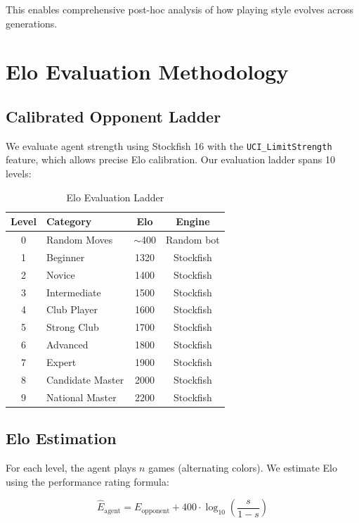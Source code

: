 \documentclass[11pt, twocolumn]{article}
\begin{document}
This enables comprehensive post-hoc analysis of how playing style evolves across generations.

\section{Elo Evaluation Methodology}
\label{sec:elo}

\subsection{Calibrated Opponent Ladder}
We evaluate agent strength using Stockfish 16 \citep{stockfish2023} with the \texttt{UCI\_LimitStrength} feature, which allows precise Elo calibration. Our evaluation ladder spans 10 levels:

\begin{table}[H]
\centering
\caption{Elo Evaluation Ladder}
\label{tab:elo_ladder}
\small
\begin{tabular}{@{}clcc@{}}
\toprule
\textbf{Level} & \textbf{Category} & \textbf{Elo} & \textbf{Engine} \\
\midrule
0 & Random Moves     & $\sim$400  & Random bot \\
1 & Beginner         & 1320 & Stockfish \\
2 & Novice           & 1400 & Stockfish \\
3 & Intermediate     & 1500 & Stockfish \\
4 & Club Player      & 1600 & Stockfish \\
5 & Strong Club      & 1700 & Stockfish \\
6 & Advanced         & 1800 & Stockfish \\
7 & Expert           & 1900 & Stockfish \\
8 & Candidate Master & 2000 & Stockfish \\
9 & National Master  & 2200 & Stockfish \\
\bottomrule
\end{tabular}
\end{table}

\subsection{Elo Estimation}
For each level, the agent plays $n$ games (alternating colors). We estimate Elo using the performance rating formula:

\begin{equation}
    \hat{E}_{\text{agent}} = E_{\text{opponent}} + 400 \cdot \log_{10}\left(\frac{s}{1 - s}\right)
    \label{eq:performance_rating}
\end{equation}
\end{document}
